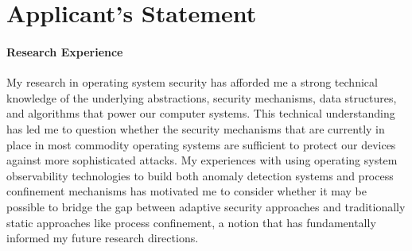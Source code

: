 


\section{Applicant's Statement}

\paragraph*{Research Experience}
My research in operating system security has afforded me a strong technical
knowledge of the underlying abstractions, security mechanisms, data structures,
and algorithms that power our computer systems. This technical understanding has
led me to question whether the security mechanisms that are currently in place
in most commodity operating systems are sufficient to protect our devices
against more sophisticated attacks. My experiences with using operating system
observability technologies to build both anomaly detection systems and process
confinement mechanisms has motivated me to consider whether it may be possible
to bridge the gap between adaptive security approaches and traditionally static
approaches like process confinement, a notion that has fundamentally informed
my future research directions.

